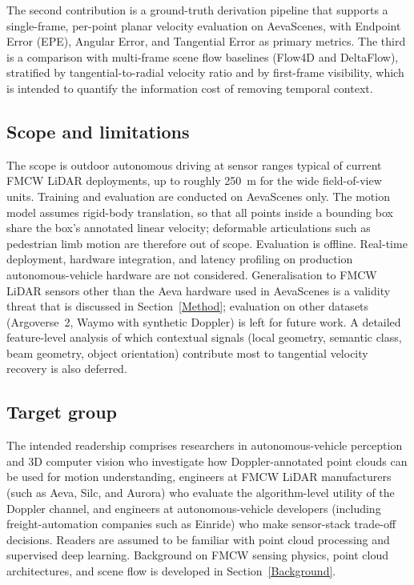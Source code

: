 \documentclass[a4paper,12pt]{article}
\begin{document}
The second contribution is a ground-truth derivation pipeline that supports a single-frame, per-point planar velocity evaluation on AevaScenes, with Endpoint Error (EPE), Angular Error, and Tangential Error as primary metrics. The third is a comparison with multi-frame scene flow baselines (Flow4D and DeltaFlow), stratified by tangential-to-radial velocity ratio and by first-frame visibility, which is intended to quantify the information cost of removing temporal context.

\subsection{Scope and limitations}

The scope is outdoor autonomous driving at sensor ranges typical of current FMCW LiDAR deployments, up to roughly 250~m for the wide field-of-view units. Training and evaluation are conducted on AevaScenes only. The motion model assumes rigid-body translation, so that all points inside a bounding box share the box's annotated linear velocity; deformable articulations such as pedestrian limb motion are therefore out of scope. Evaluation is offline. Real-time deployment, hardware integration, and latency profiling on production autonomous-vehicle hardware are not considered. Generalisation to FMCW LiDAR sensors other than the Aeva hardware used in AevaScenes is a validity threat that is discussed in Section~\ref{Method}; evaluation on other datasets (Argoverse~2, Waymo with synthetic Doppler) is left for future work. A detailed feature-level analysis of which contextual signals (local geometry, semantic class, beam geometry, object orientation) contribute most to tangential velocity recovery is also deferred.

\subsection{Target group}

The intended readership comprises researchers in autonomous-vehicle perception and 3D computer vision who investigate how Doppler-annotated point clouds can be used for motion understanding, engineers at FMCW LiDAR manufacturers (such as Aeva, Silc, and Aurora) who evaluate the algorithm-level utility of the Doppler channel, and engineers at autonomous-vehicle developers (including freight-automation companies such as Einride) who make sensor-stack trade-off decisions. Readers are assumed to be familiar with point cloud processing and supervised deep learning. Background on FMCW sensing physics, point cloud architectures, and scene flow is developed in Section~\ref{Background}.
\end{document}
